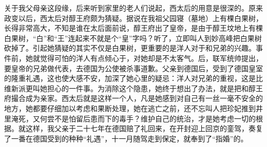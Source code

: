   关于我父母亲这段缘，后来听到家里的老人们说起，西太后的用意是很深的。原来政变以后，西太后对醇王府颇为猜疑。据说在我祖父园寝（墓地）上有棵白果树，长得非常高大，不知是谁在太后面前说，醇王府出了皇帝，是由于醇王坟地上有棵白果树，“白”和“王”连起来不就是个“皇”字吗？听了，立即叫人到妙高峰把白果树砍掉了。引起她猜疑的其实不仅是白果树，更重要的是洋人对于和兄弟的兴趣。事件前，她就觉得可怕的洋人有点倾心于，对她却是不太客气。后，联军统帅提出，要皇帝的兄弟做代表，去德国为公使被杀事道歉。父亲到德国后，受到了德国皇室的隆重礼遇，这也使大感不安，加深了她心里的疑忌：洋人对兄弟的重视，这是比维新派更叫她担心的一件事。为消除这个隐患，她终于想出了办法，就是把和醇王府撮合成为亲家。西太后就是这样一个人，凡是她感到对自己有一丝一毫不安全的地方，她都要仔细加以考虑和果断处理，她在逃亡之前，还不忘叫人把珍妃推到井里淹死，又何尝不是怕留后患而下的毒手？维护自己的统治，才是她考虑一切的根据。就这样，我父亲于二十七年在德国赔了礼回来，在开封迎上回京的銮驾，奏复了一番在德国受到的种种“礼遇”，十一月随驾走到保定，就奉到了“指婚”的。
